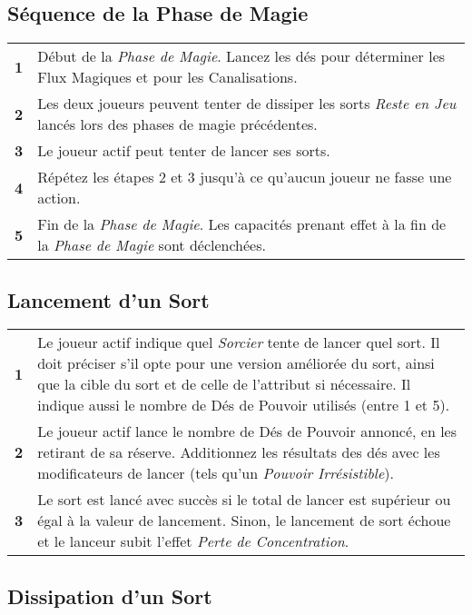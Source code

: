 \documentclass[a4paper,8pt]{extarticle}
\begin{document}
\begin{minipage}[t]{.47\linewidth}
\fontsize{10}{10}\selectfont

\subsection*{Séquence de la Phase de Magie}

\begin{tabular}{c|m{6.8cm}}
\textbf{1} & Début de la \emph{Phase de Magie}. Lancez les dés pour déterminer les Flux Magiques et pour les Canalisations. \tabularnewline
\textbf{2} & Les deux joueurs peuvent tenter de dissiper les sorts \emph{Reste en Jeu} lancés lors des phases de magie précédentes. \tabularnewline
\textbf{3} & Le joueur actif peut tenter de lancer ses sorts. \tabularnewline
\textbf{4} & Répétez les étapes 2 et 3 jusqu'à ce qu'aucun joueur ne fasse une action. \tabularnewline
\textbf{5} & Fin de la \emph{Phase de Magie}. Les capacités prenant effet à la fin de la \emph{Phase de Magie} sont déclenchées. \tabularnewline
\end{tabular}

\subsection*{Lancement d'un Sort}

\begin{tabular}{c|m{6.8cm}}
\textbf{1} & Le joueur actif indique quel \emph{Sorcier} tente de lancer quel sort. Il doit préciser s'il opte pour une version améliorée du sort, ainsi que la cible du sort et de celle de l'attribut si nécessaire. Il indique aussi le nombre de Dés de Pouvoir utilisés (entre 1 et 5). \tabularnewline
\textbf{2} & Le joueur actif lance le nombre de Dés de Pouvoir annoncé, en les retirant de sa réserve. Additionnez les résultats des dés avec les modificateurs de lancer (tels qu'un \emph{Pouvoir Irrésistible}). \tabularnewline
\textbf{3} & Le sort est lancé avec succès si le total de lancer est supérieur ou égal à la valeur de lancement. Sinon, le lancement de sort échoue et le lanceur subit l'effet \emph{Perte de Concentration}. \tabularnewline
\end{tabular}

\subsection*{Dissipation d'un Sort}


\end{minipage}
\end{document}
